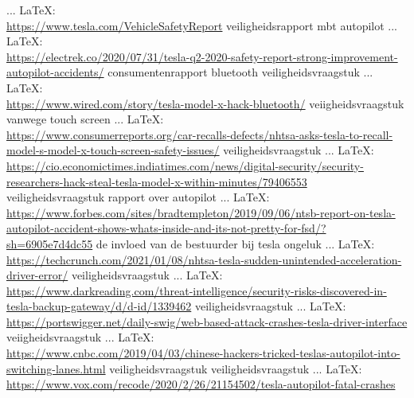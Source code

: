 \begin{thebibliography}{99}
{{{{				 ... \LaTeX:\\ \url{https://www.tesla.com/VehicleSafetyReport}
				veiligheidsrapport mbt autopilot
				 ... \LaTeX:\\ \url{https://electrek.co/2020/07/31/tesla-q2-2020-safety-report-strong-improvement-autopilot-accidents/}
				consumentenrapport
				bluetooth veiligheidsvraagstuk
				 ... \LaTeX:\\ \url{https://www.wired.com/story/tesla-model-x-hack-bluetooth/}
				veiigheidsvraagstuk vanwege touch screen
				 ... \LaTeX:\\ \url{https://www.consumerreports.org/car-recalls-defects/nhtsa-asks-tesla-to-recall-model-s-model-x-touch-screen-safety-issues/}
				veiligheidsvraagstuk
				 ... \LaTeX:\\ \url{https://cio.economictimes.indiatimes.com/news/digital-security/security-researchers-hack-steal-tesla-model-x-within-minutes/79406553}
				veiligheidsvraagstuk
				rapport over autopilot
				 ... \LaTeX:\\ \url{https://www.forbes.com/sites/bradtempleton/2019/09/06/ntsb-report-on-tesla-autopilot-accident-shows-whats-inside-and-its-not-pretty-for-fsd/?sh=6905e7d4dc55}
				de invloed van de bestuurder bij tesla ongeluk
				 ... \LaTeX:\\ \url{https://techcrunch.com/2021/01/08/nhtsa-tesla-sudden-unintended-acceleration-driver-error/}
				veiligheidsvraagstuk
				 ... \LaTeX:\\ \url{https://www.darkreading.com/threat-intelligence/security-risks-discovered-in-tesla-backup-gateway/d/d-id/1339462}
				veiligheidsvraagstuk
				 ... \LaTeX:\\ \url{https://portswigger.net/daily-swig/web-based-attack-crashes-tesla-driver-interface}
				veiigheidsvraagstuk
				 ... \LaTeX:\\ \url{https://www.cnbc.com/2019/04/03/chinese-hackers-tricked-teslas-autopilot-into-switching-lanes.html}
				veiligheidsvraagstuk
				veiligheidsvraagstuk
				 ... \LaTeX:\\ \url{https://www.vox.com/recode/2020/2/26/21154502/tesla-autopilot-fatal-crashes}
}}}}
\end{thebibliography}

